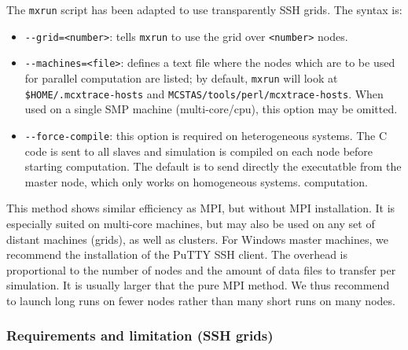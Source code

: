   The \verb'mxrun' script has been adapted to use transparently SSH grids. The syntax is:
\begin{itemize}
\item \verb'--grid=<number>': tells \verb'mxrun' to use the grid over \verb'<number>' nodes.
\item \verb'--machines=<file>': defines a text file where the
  nodes which are to be used for parallel computation are listed; by
  default, \verb'mxrun' will look at \verb'$HOME/.mcxtrace-hosts' and
  \verb'MCSTAS/tools/perl/mcxtrace-hosts'. When used on a single SMP machine 
  (multi-core/cpu), this option may be omitted.
\item \verb'--force-compile': this option is required on heterogeneous systems. 
  The C code is sent to all slaves and simulation is compiled on each node before 
  starting computation. The default is to send directly the executatble from the 
  master node, which only works on homogeneous systems.
  computation. 
\end{itemize}
  
  This method shows similar efficiency as MPI, but without MPI installation. It is 
  especially suited on multi-core machines, but may also be used on any set of distant 
  machines (grids), as well as clusters. For Windows master machines,
  we recommend the installation of the PuTTY SSH client. The overhead is proportional to
  the number of nodes and the amount of data files to transfer per simulation. It is 
  usually larger that the pure MPI method. We thus recommend to launch long runs on fewer nodes
  rather than many short runs on many nodes.
  
\subsubsection{Requirements and limitation (SSH grids)}

